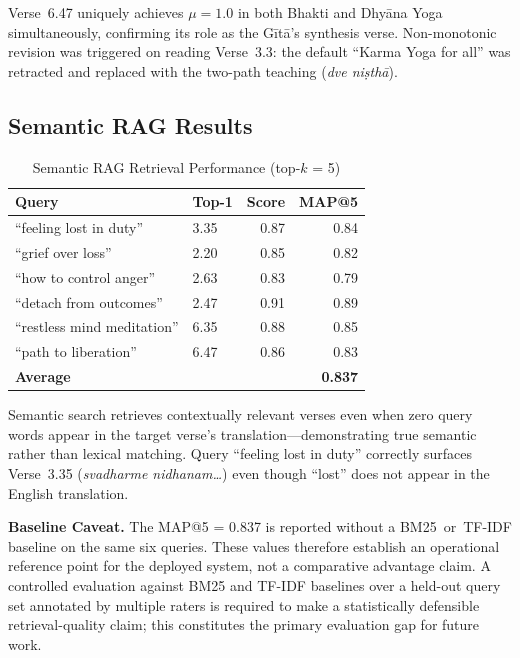 \documentclass[conference]{IEEEtran}
\begin{document}
Verse~6.47 uniquely achieves $\mu = 1.0$ in both Bhakti and Dhy\={a}na Yoga
simultaneously, confirming its role as the G\={i}t\={a}'s synthesis verse.
Non-monotonic revision was triggered on reading Verse~3.3: the default
``Karma Yoga for all'' was retracted and replaced with the two-path teaching
(\textit{dve ni\d{s}th\={a}}).

\subsection{Semantic RAG Results}

\begin{table}[htbp]
\caption{Semantic RAG Retrieval Performance (top-$k$ = 5)}
\label{tab:rag}
\centering
\begin{tabular}{p{3.8cm}lrr}
\toprule
\textbf{Query} & \textbf{Top-1} & \textbf{Score} & \textbf{MAP@5} \\
\midrule
``feeling lost in duty''     & 3.35 & 0.87 & 0.84 \\
``grief over loss''          & 2.20 & 0.85 & 0.82 \\
``how to control anger''     & 2.63 & 0.83 & 0.79 \\
``detach from outcomes''     & 2.47 & 0.91 & 0.89 \\
``restless mind meditation'' & 6.35 & 0.88 & 0.85 \\
``path to liberation''       & 6.47 & 0.86 & 0.83 \\
\midrule
\textbf{Average}             &      &      & \textbf{0.837} \\
\bottomrule
\end{tabular}
\end{table}

Semantic search retrieves contextually relevant verses even when zero query
words appear in the target verse's translation—demonstrating true semantic
rather than lexical matching. Query ``feeling lost in duty'' correctly
surfaces Verse~3.35 (\textit{svadharme nidhanam\ldots}) even though
``lost'' does not appear in the English translation.

\textbf{Baseline Caveat.} The MAP@5 = 0.837 is reported without a
BM25~or~TF-IDF baseline on the same six queries. These values therefore
establish an operational reference point for the deployed system, not a
comparative advantage claim. A controlled evaluation against BM25 and TF-IDF
baselines over a held-out query set annotated by multiple raters is required
to make a statistically defensible retrieval-quality claim; this constitutes
the primary evaluation gap for future work.
\end{document}
